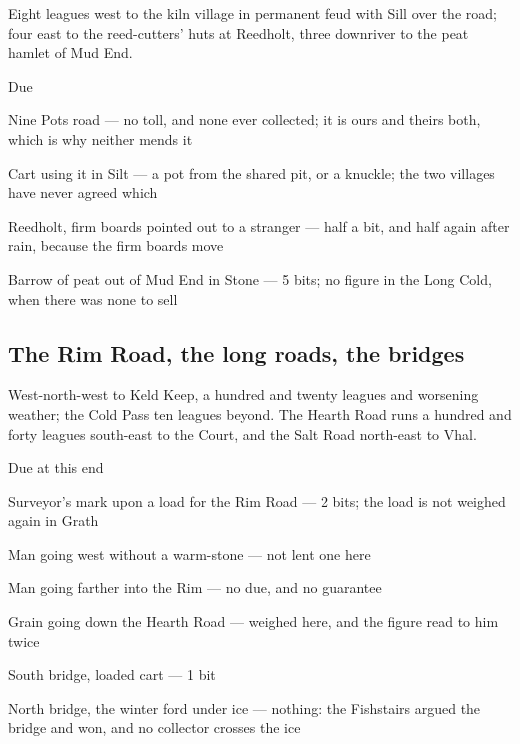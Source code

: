 \documentclass{design/chronicle}
\begin{document}
Eight leagues west to the kiln village in permanent feud with Sill over the road; four east to the reed-cutters’ huts at Reedholt, three downriver to the peat hamlet of Mud End.

Due\par

Nine Pots road — no toll, and none ever collected; it is ours and theirs both, which is why neither mends it\par

Cart using it in Silt — a pot from the shared pit, or a knuckle; the two villages have never agreed which\par

Reedholt, firm boards pointed out to a stranger — half a bit, and half again after rain, because the firm boards move\par

Barrow of peat out of Mud End in Stone — 5 bits; no figure in the Long Cold, when there was none to sell\par

\subsection*{The Rim Road, the long roads, the bridges}

West-north-west to Keld Keep, a hundred and twenty leagues and worsening weather; the Cold Pass ten leagues beyond. The Hearth Road runs a hundred and forty leagues south-east to the Court, and the Salt Road north-east to Vhal.

Due at this end\par

Surveyor’s mark upon a load for the Rim Road — 2 bits; the load is not weighed again in Grath\par

Man going west without a warm-stone — not lent one here\par

Man going farther into the Rim — no due, and no guarantee\par

Grain going down the Hearth Road — weighed here, and the figure read to him twice\par

South bridge, loaded cart — 1 bit\par

North bridge, the winter ford under ice — nothing: the Fishstairs argued the bridge and won, and no collector crosses the ice\par
\end{document}
